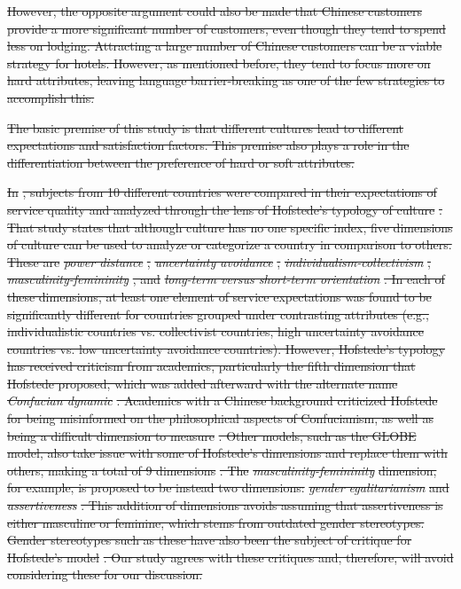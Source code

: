 \documentclass[smallextended,natbib]{svjour3}       %
\providecommand{\DIFdel}[1]{{\protect\color{red}\sout{#1}}}                      %
\providecommand{\DIFdelbegin}{} %
\newcommand{\DIFscaledelfig}{0.5}
\newlength{\DIFdelgraphicswidth} %
\newlength{\DIFdelgraphicsheight} %
\newcommand{\DIFdelincludegraphics}[2][]{%
\sbox{\DIFdelgraphicsbox}{\DIFOincludegraphics[#1]{#2}}%
\settoboxwidth{\DIFdelgraphicswidth}{\DIFdelgraphicsbox} %
\settoboxtotalheight{\DIFdelgraphicsheight}{\DIFdelgraphicsbox} %
\scalebox{\DIFscaledelfig}{%
\parbox[b]{\DIFdelgraphicswidth}{\usebox{\DIFdelgraphicsbox}\\[-\baselineskip] \rule{\DIFdelgraphicswidth}{0em}}\llap{\resizebox{\DIFdelgraphicswidth}{\DIFdelgraphicsheight}{%
\setlength{\unitlength}{\DIFdelgraphicswidth}%
\begin{picture}(1,1)%
\thicklines\linethickness{2pt} %
{\color[rgb]{1,0,0}\put(0,0){\framebox(1,1){}}}%
{\color[rgb]{1,0,0}\put(0,0){\line( 1,1){1}}}%
{\color[rgb]{1,0,0}\put(0,1){\line(1,-1){1}}}%
\end{picture}%
}\hspace*{3pt}}} %
} %
\DeclareRobustCommand{\DIFdelbegin}{\DIFOdelbegin \let\includegraphics\DIFdelincludegraphics} %
\begin{document}
  \DIFdelbegin \DIFdel{However, the opposite argument could also be made that Chinese customers provide a more significant number of customers, even though they tend to spend less on lodging. Attracting a large number of Chinese customers can be a viable strategy for hotels. However, as mentioned before, they tend to focus more on hard attributes, leaving language barrier-breaking as one of the few strategies to accomplish this.
}%

\DIFdel{The basic premise of this study is that different cultures lead to different expectations and satisfaction factors. This premise also plays a role in the differentiation between the preference of hard or soft attributes.
}%

\DIFdel{In }%
\DIFdel{, subjects from 10 different countries were compared in their expectations of service quality and analyzed through the lens of Hofstede's typology of culture }%
\DIFdel{. That study states that although culture has no one specific index, five dimensions of culture can be used to analyze or categorize a country in comparison to others. These are }\textit{\DIFdel{power distance}}%
\DIFdel{, }\textit{\DIFdel{uncertainty avoidance}}%
\DIFdel{, }\textit{\DIFdel{individualism-collectivism}}%
\DIFdel{, }\textit{\DIFdel{masculinity-femininity}}%
\DIFdel{, and }\textit{\DIFdel{long-term versus short-term orientation}}%
\DIFdel{. In each of these dimensions, at least one element of service expectations was found to be significantly different for countries grouped under contrasting attributes (e.g., individualistic countries vs. collectivist countries, high uncertainty avoidance countries vs. low uncertainty avoidance countries). However, Hofstede's typology has received criticism from academics, particularly the fifth dimension that Hofstede proposed, which was added afterward with the alternate name }\textit{\DIFdel{Confucian dynamic}}%
\DIFdel{. Academics with a Chinese background criticized Hofstede for being misinformed on the philosophical aspects of Confucianism, as well as being a difficult dimension to measure }%
\DIFdel{. Other models, such as the GLOBE model, also take issue with some of Hofstede's dimensions and replace them with others, making a total of 9 dimensions }%
\DIFdel{. The }\textit{\DIFdel{masculinity-femininity}} %
\DIFdel{dimension, for example, is proposed to be instead two dimensions: }\textit{\DIFdel{gender egalitarianism}} %
\DIFdel{and }\textit{\DIFdel{assertiveness}}%
\DIFdel{. This addition of dimensions avoids assuming that assertiveness is either masculine or feminine, which stems from outdated gender stereotypes. Gender stereotypes such as these have also been the subject of critique for Hofstede's model}%
\DIFdel{. Our study agrees with these critiques and, therefore, will avoid considering these for our discussion.
    }%
\end{document}
